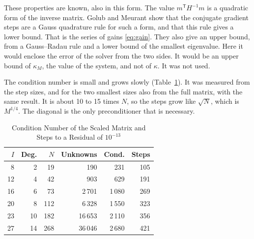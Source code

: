 \documentclass[journal]{IEEEtran}
\newcommand{\T}{\mathsf T}
\begin{document}
These properties are known, also in this form. The value $m^{\T}H^{-1}m$ is a quadratic form of the inverse matrix. Golub and Meurant \cite{golub,golubbook} show that the conjugate gradient steps are a Gauss quadrature rule for such a form, and that this rule gives a lower bound. That is the series of gains \eqref{eq:gain}. They also give an upper bound, from a Gauss--Radau rule and a lower bound of the smallest eigenvalue. Here it would enclose the error of the solver from the two sides. It would be an upper bound of $\kappa_M$, the value of the system, and not of $\kappa$. It was not used.

The condition number is small and grows slowly (Table~\ref{tab:condition}). It was measured from the step sizes, and for the two smallest sizes also from the full matrix, with the same result. It is about 10 to 15 times $N$, so the steps grow like $\sqrt N$, which is $M^{1/4}$. The diagonal is the only preconditioner that is necessary.

\begin{table}[!t]
\caption{Condition Number of the Scaled Matrix and Steps to a Residual of $10^{-13}$}
\label{tab:condition}
\centering
\begin{tabular}{rrrrrr}
\toprule
$I$ & Deg. & $N$ & Unknowns & Cond. & Steps\\
\midrule
8 & 2 & 19 & 190 & 231 & 105\\
12 & 4 & 42 & 903 & 629 & 191\\
16 & 6 & 73 & 2\,701 & 1\,080 & 269\\
20 & 8 & 112 & 6\,328 & 1\,550 & 323\\
23 & 10 & 182 & 16\,653 & 2\,110 & 356\\
27 & 14 & 268 & 36\,046 & 2\,680 & 421\\
\bottomrule
\end{tabular}
\end{table}
\end{document}
